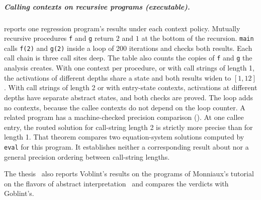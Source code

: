 \subparagraph*{Calling contexts on recursive programs (executable).}
 reports one regression program's results under each context policy.
Mutually recursive procedures \texttt{f} and \texttt{g} return $2$ and $1$ at
the bottom of the recursion. \texttt{main} calls \texttt{f(2)} and
\texttt{g(2)} inside a loop of 200 iterations and checks both results. Each
call chain is three call sites deep. The table also counts the copies of
\texttt{f} and \texttt{g} the analysis creates. With one context per
procedure, or with call strings of length 1, the activations of different
depths share a state and both results widen to $[1,12]$. With call strings of length 2 or with
entry-state contexts, activations at different depths have separate abstract
states, and both checks are proved. The
loop adds no contexts, because the callee contexts do not depend on the loop
counter. A related program has a machine-checked precision comparison
(). At one callee entry,
the routed solution for call-string length 2 is strictly more precise than
for length 1. That theorem compares
two equation-system solutions computed by \texttt{eval} for this program.
It establishes neither a corresponding result about 
nor a general precision ordering between call-string lengths.

\begin{table}[t]
\centering
\small

\caption{Callee contexts of \texttt{f} and \texttt{g}, verdicts and computed
values for the two checks of the regression fixture
\texttt{09-depth2\_mutual\_recursion\_in\_loop} (group \texttt{17-call-string})
under Interval, per context policy. Concretely, \texttt{res1} is always $2$ and
\texttt{res2} always $1$. Generated from reproducible analyzer runs.}
\label{tab:contexts}
\end{table}

The thesis~\cite{lerchner26thesis} also reports Voblint's results on the programs of Monniaux's
tutorial on the flavors of abstract interpretation~\cite{monniaux24} and
compares the verdicts with Goblint's.

